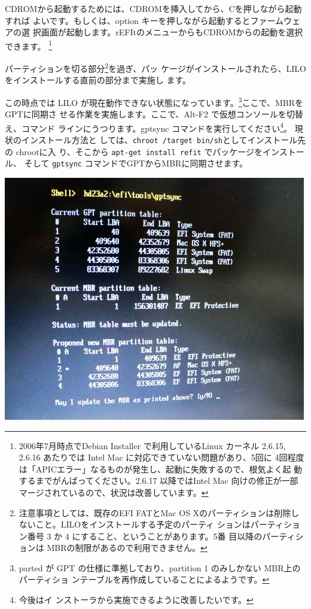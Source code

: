 \documentclass[mingoth,a4paper]{jsarticle}
\begin{document}
CDROMから起動するためには、CDROMを挿入してから、Cを押しながら起動すれば
よいです。もしくは、option キーを押しながら起動するとファームウェアの選
択画面が起動します。rEFItのメニューからもCDROMからの起動を選択できます。
\footnote{2006年7月時点でDebian Installer で利用しているLinux カーネル 
2.6.15, 2.6.16 あたりでは Intel Mac に対応できていない問題があり、5回に
4回程度は「APICエラー」なるものが発生し、起動に失敗するので、根気よく起
動するまでがんばってください。2.6.17 以降ではIntel Mac 向けの修正が一部
マージされているので、状況は改善しています。}

パーティションを切る部分\footnote{注意事項としては、既存のEFI FATとMac
OS Xのパーティションは削除しないこと。LILOをインストールする予定のパーティ
ションはパーティション番号 3 か 4 にすること、ということがあります。5番
目以降のパーティションは MBRの制限があるので利用できません。}を過ぎ、パッ
ケージがインストールされたら、LILOをインストールする直前の部分まで実施し
ます。

この時点では LILO が現在動作できない状態になっています。\footnote{parted 
が GPT の仕様に準拠しており、partition 1 のみしかない MBR上のパーティショ
ンテーブルを再作成していることによるようです。}ここで、MBRをGPTに同期さ
せる作業を実施します。ここで、Alt-F2 で仮想コンソールを切替え、コマンド
ラインにうつります。gptsync コマンドを実行してください\footnote{今後はイ
ンストーラから実施できるように改善したいです。}。 現状のインストール方法と
しては、\texttt{chroot /target bin/sh}としてインストール先の chrootに入
り、そこから \texttt{apt-get install refit} でパッケージをインストール、
そして \texttt{gptsync} コマンドでGPTからMBRに同期させます。

\includegraphics[width=0.9\hsize]{image200607/gptsync.png}
\end{document}
